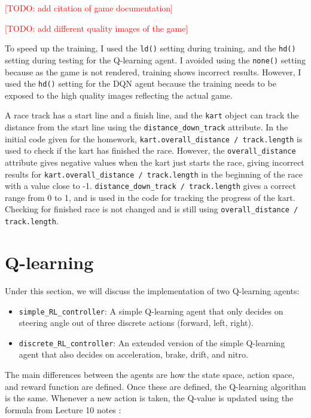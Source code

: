 \documentclass{article}
\newcommand{\todo}[1]{\textcolor{red}{[TODO: #1]}}
\begin{document}
\todo{add citation of game documentation}

\todo{add different quality images of the game}

To speed up the training, I used the \texttt{ld()} setting during training, and the \texttt{hd()} setting during testing for the Q-learning agent. 
I avoided using the \texttt{none()} setting because as the game is not rendered, training shows incorrect results. However, I used the \texttt{hd()} setting
for the DQN agent because the training needs to be exposed to the high quality images reflecting the actual game.

A race track has a start line and a finish line, and the \texttt{kart} object can track the distance from the start line using the \texttt{distance\_down\_track} attribute. 
In the initial code given for the homework, \texttt{kart.overall\_distance / track.length} is used to check if the kart has finished the race. However, the \texttt{overall\_distance}
attribute gives negative values when the kart just starts the race, giving incorrect results for \texttt{kart.overall\_distance / track.length} in the beginning of the race with a value close to -1.
\texttt{distance\_down\_track / track.length} gives a correct range from 0 to 1, and is used in the code for tracking the progress of the kart. Checking for finished race is not changed and is
 still using \texttt{overall\_distance / track.length}.

\section{Q-learning}

Under this section, we will discuss the implementation of two Q-learning agents:
\begin{itemize}
    \item \texttt{simple\_RL\_controller}: A simple Q-learning agent that only decides on steering angle out of three discrete actions (forward, left, right).
    \item \texttt{discrete\_RL\_controller}: An extended version of the simple Q-learning agent that also decides on acceleration, brake, drift, and nitro.
\end{itemize}

The main differences between the agents are how the state space, action space, and reward function are defined. Once these are defined, the Q-learning algorithm is the same. Whenever a new action is taken, the Q-value is updated using the formula from Lecture 10 notes \citep{lecnotes}:
\end{document}
